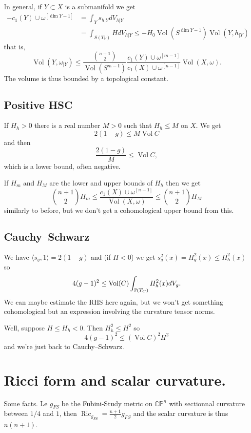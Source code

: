 \documentclass{amsart}
\numberwithin{equation}{section}
\theoremstyle{definition}
\DeclareMathOperator{\Ric}{Ric}
\DeclareMathOperator{\Vol}{Vol}
\begin{document}
In general, if $Y \subset X$ is a submanifold we get
\begin{align*}
-c_1(Y) \cup \omega^{[\dim Y - 1]}
&= \int_Y s_{h|Y} dV_{h|Y}
\\
&= \int_{S(T_Y)} H dV_{h|Y}
\leq -H_0 \Vol(S^{\dim Y- 1}) \Vol(Y, h_{|Y})
\end{align*}
that is,
$$
\Vol(Y, \omega_{|Y})
\leq \frac{\binom{n+1}{2}}{\Vol(S^{m-1})}
\frac{c_1(Y) \cup \omega^{[m-1]}}
{c_1(X) \cup \omega^{[n-1]}} \Vol(X, \omega).
$$
The volume is thus bounded by a topological constant.


\subsection*{Positive HSC}
If $H_h > 0$ there is a real number $M > 0$ such that $H_h \leq M$ on $X$.
We get
$$
2(1-g)
\leq M \Vol C
$$
and then
$$
\frac{2(1-g)}{M}
\leq
\Vol C,
$$
which is a lower bound, often negative.

If $H_m$ and $H_M$ are the lower and upper bounds of $H_h$ then we get
$$
\binom{n+1}{2} H_m
\leq \frac{c_1(X) \cup \omega^{[n-1]}}{\Vol(X,\omega)}
\leq \binom{n+1}{2} H_M
$$
similarly to before, but we don't get a cohomological upper bound from this.


\subsection*{Cauchy--Schwarz}

\def\<{\langle}
\def\>{\rangle}

We have $\< s_g, 1 \> = 2(1-g)$ and
(if $H < 0$) we get
$s_g^2(x) = H_g^2(x) \leq H_h^2(x)$ so
$$
4(g-1)^2 \leq \Vol(C) \int_{\kk P(T_C)} H_h^2(x) dV_g.
$$
We can maybe estimate the RHS here again, but we won't get something
cohomological but an expression involving the curvature tensor norms.

Well, suppose $H \leq H_h < 0$.
Then $H_h^2 \leq H^2$ so
$$
4(g-1)^2 \leq (\Vol C)^2 H^2
$$
and we're just back to Cauchy--Schwarz.


\appendix
\section{Ricci form and scalar curvature.}

Some facts. Le $g_{FS}$ be the Fubini-Study metric on $\mathbb{CP}^n$ with sectionnal curvature between $1/4$ and $1$, then $\Ric_{g_{FS}}=\frac{n+1}{2}g_{FS}$ and the scalar curvature is thus $n(n+1)$.
\end{document}
